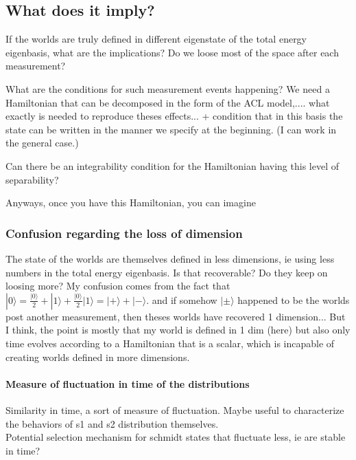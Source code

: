 \documentclass{article}
\begin{document}
\subsection{What does it imply?}

If the worlds are truly defined in different eigenstate of the total energy eigenbasis, what are the implications? Do we loose most of the space after each measurement? 

What are the conditions for such measurement events happening? We need a Hamiltonian that can be decomposed in the form of the ACL model,.... what exactly is needed to reproduce theses effects... 
+ condition that in this basis the state can be written in the manner we specify at the beginning. (I can work in the general case.) 

Can there be an integrability condition for the Hamiltonian having this level of separability? 

Anyways, once you have this Hamiltonian, you can imagine

\subsubsection{Confusion regarding the loss of dimension}

The state of the worlds are themselves defined in less dimensions, ie using less numbers in the total energy eigenbasis. Is that recoverable? Do they keep on loosing more? 
My confusion comes from the fact that $|0\rangle=\frac{|0\rangle}{2}+|1\rangle+\frac{|0\rangle}{2}|1\rangle=|+\rangle+|-\rangle$. and if somehow $|\pm\rangle$ happened to be the worlds post another measurement, then theses worlds have recovered 1 dimension... 
But I think, the point is mostly that my world is defined in 1 dim (here) but also only time evolves according to a Hamiltonian that is a scalar, which is incapable of creating worlds defined in more dimensions.




\paragraph{Measure of fluctuation in time of the distributions}
Similarity in time, a sort of measure of fluctuation. Maybe useful to characterize the behaviors of s1 and s2 distribution themselves.\\

Potential selection mechanism for schmidt states that fluctuate less, ie are stable in time?
\end{document}
